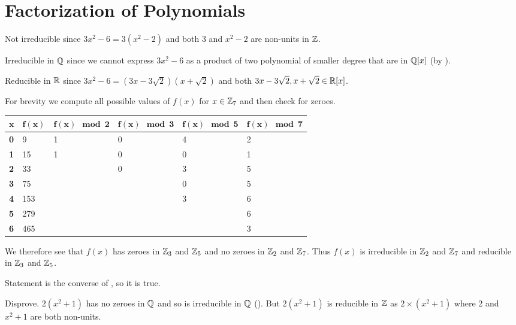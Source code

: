 \section{Factorization of Polynomials}
\begin{questions}
    \item \begin{partquestions}{\alph*}
        \item Not irreducible since $3x^2 - 6 = 3(x^2-2)$ and both 3 and $x^2-2$ are non-units in $\mathbb{Z}$.
        \item Irreducible in $\mathbb{Q}$ since we cannot express $3x^2-6$ as a product of two polynomial of smaller degree that are in $\mathbb{Q}[x]$ (by ).
        \item Reducible in $\mathbb{R}$ since $3x^2 - 6 = (3x-3\sqrt2)(x+\sqrt2)$ and both $3x-3\sqrt2, x+\sqrt2 \in \mathbb{R}[x]$.
    \end{partquestions}
    
    \item For brevity we compute all possible values of $f(x)$ for $x \in \mathbb{Z}_7$ and then check for zeroes.
    \begin{table}[H]
        \centering
        \begin{tabular}{|l|l|l|l|l|l|}
            \hline
            $\boldsymbol{x}$ & $\boldsymbol{f(x)}$ & $\boldsymbol{f(x) \mod2}$ & $\boldsymbol{f(x) \mod3}$ & $\boldsymbol{f(x) \mod5}$ & $\boldsymbol{f(x) \mod7}$ \\ \hline
            \textbf{0} & 9 & 1 & 0 & 4 & 2 \\ \hline
            \textbf{1} & 15 & 1 & 0 & 0 & 1 \\ \hline
            \textbf{2} & 33 &  & 0 & 3 & 5 \\ \hline
            \textbf{3} & 75 &  &  & 0 & 5 \\ \hline
            \textbf{4} & 153 &  &  & 3 & 6 \\ \hline
            \textbf{5} & 279 &  &  &  & 6 \\ \hline
            \textbf{6} & 465 &  &  &  & 3 \\ \hline
        \end{tabular}
    \end{table}
    We therefore see that $f(x)$ has zeroes in $\mathbb{Z}_3$ and $\mathbb{Z}_5$ and no zeroes in $\mathbb{Z}_2$ and $\mathbb{Z}_7$. Thus $f(x)$ is irreducible in $\mathbb{Z}_2$ and $\mathbb{Z}_7$ and reducible in $\mathbb{Z}_3$ and $\mathbb{Z}_5$.

    \item \begin{partquestions}{\alph*}
        \item Statement is the converse of , so it is true.
        \item Disprove. $2(x^2+1)$ has no zeroes in $\mathbb{Q}$ and so is irreducible in $\mathbb{Q}$ (). But $2(x^2+1)$ is reducible in $\mathbb{Z}$ as $2 \times (x^2 + 1)$ where 2 and $x^2 + 1$ are both non-units.
    \end{partquestions}
\end{questions}
